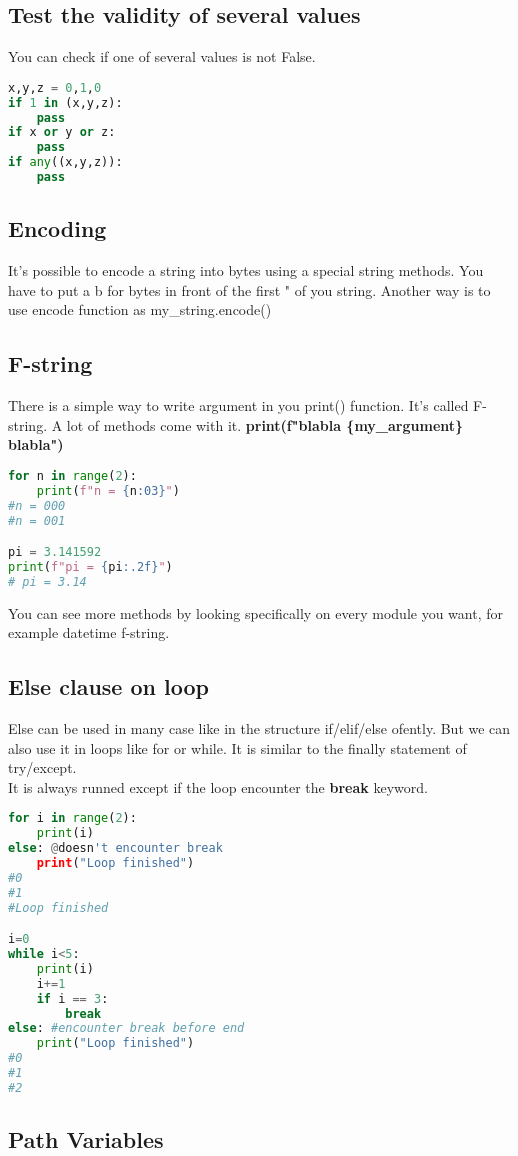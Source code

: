 \documentclass[a4paper, 12pt, titlepage]{scrartcl} %
\begin{document}
\subsection{Test the validity of several values}
You can check if one of several values is not False.
\begin{lstlisting}[language=Python]
x,y,z = 0,1,0
if 1 in (x,y,z):
    pass
if x or y or z:
    pass
if any((x,y,z)):
    pass
\end{lstlisting}

\subsection{Encoding}
It's possible to encode a string into bytes using a special string methods. You have to put a b for bytes in front of the first " of you string. Another way is to use encode function as my\_string.encode()

\subsection{F-string}
\label{subsec:F-string}
There is a simple way to write argument in you print() function. It's called F-string. A lot of methods come with it. \textbf{print(f"blabla \{my\_argument\} blabla")}
\begin{lstlisting}[language=Python]
for n in range(2):
	print(f"n = {n:03}")
#n = 000
#n = 001

pi = 3.141592
print(f"pi = {pi:.2f}") 
# pi = 3.14
\end{lstlisting}

You can see more methods by looking specifically on every module you want, for example datetime f-string.

\subsection{Else clause on loop}
Else can be used in many case like in the structure if/elif/else ofently. But we can also use it in loops like for or while. It is similar to the finally statement of try/except. \\
It is always runned except if the loop encounter the \textbf{break} keyword.

\begin{lstlisting}[language=Python]
for i in range(2):
    print(i)
else: @doesn't encounter break
    print("Loop finished")
#0
#1
#Loop finished

i=0
while i<5:
    print(i)
    i+=1
    if i == 3:
        break
else: #encounter break before end
    print("Loop finished")
#0
#1
#2
\end{lstlisting}

\subsection{Path Variables}
\label{PathVariables}
\end{document}

